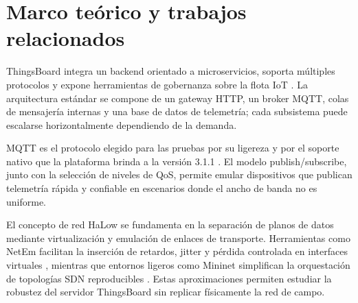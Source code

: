 \section{Marco te\'orico y trabajos relacionados}
ThingsBoard integra un backend orientado a microservicios, soporta m\'ultiples protocolos y expone herramientas de gobernanza sobre la flota IoT \cite{thingsboard-docs}. La arquitectura est\'andar se compone de un gateway HTTP, un broker MQTT, colas de mensajer\'ia internas y una base de datos de telemetr\'ia; cada subsistema puede escalarse horizontalmente dependiendo de la demanda.

MQTT es el protocolo elegido para las pruebas por su ligereza y por el soporte nativo que la plataforma brinda a la versi\'on 3.1.1 \cite{oasis-mqtt311}. El modelo publish/subscribe, junto con la selecci\'on de niveles de QoS, permite emular dispositivos que publican telemetr\'ia r\'apida y confiable en escenarios donde el ancho de banda no es uniforme.

El concepto de red HaLow se fundamenta en la separaci\'on de planos de datos mediante virtualizaci\'on y emulaci\'on de enlaces de transporte. Herramientas como NetEm facilitan la inserci\'on de retardos, jitter y p\'erdida controlada en interfaces virtuales \cite{hemminger2005netem}, mientras que entornos ligeros como Mininet simplifican la orquestaci\'on de topolog\'ias SDN reproducibles \cite{lantz2010network}. Estas aproximaciones permiten estudiar la robustez del servidor ThingsBoard sin replicar f\'isicamente la red de campo.
